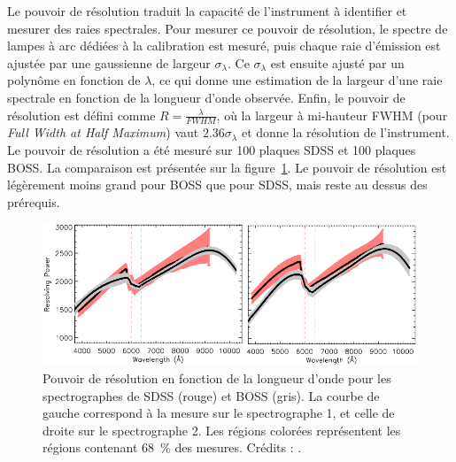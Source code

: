 Le pouvoir de résolution traduit la capacité de l'instrument à identifier et mesurer des raies spectrales. Pour mesurer ce pouvoir de résolution, le spectre de lampes à arc dédiées à la calibration est mesuré, puis chaque raie d'émission est ajustée par une gaussienne de largeur $\sigma_\lambda$. Ce $\sigma_\lambda$ est ensuite ajusté par un polynôme en fonction de $\lambda$, ce qui donne une estimation de la largeur d'une raie spectrale en fonction de la longueur d'onde observée.
Enfin, le pouvoir de résolution est défini comme $R = \frac{\lambda}{FWHM}$, où la largeur à mi-hauteur FWHM (pour \emph{Full Width at Half Maximum}) vaut $\num{2.36}\sigma_{\lambda}$ et donne la résolution de l'instrument.
Le pouvoir de résolution a été mesuré sur \num{100} plaques SDSS et \num{100} plaques BOSS. La comparaison est présentée sur la figure~\ref{fig:SpectroResoPower}. Le pouvoir de résolution est légèrement moins grand pour BOSS que pour SDSS, mais reste au dessus des prérequis.
\begin{figure}
  \centering
  \includegraphics[scale=0.5]{SpectroResoPower}
  \caption{Pouvoir de résolution en fonction de la longueur d'onde pour les spectrographes de SDSS (rouge) et BOSS (gris). La courbe de gauche correspond à la mesure sur le spectrographe 1, et celle de droite sur le spectrographe 2. Les régions colorées représentent les régions contenant \SI{68}{\percent} des mesures. Crédits : \textcite{Smee2012}.}
  \label{fig:SpectroResoPower}
\end{figure}


\newpage

